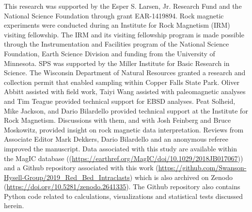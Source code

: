 \documentclass[draft]{agujournal2019}
\begin{document}
%
%
%
%
%
%
%
%


\acknowledgments
This research was supported by the Esper S. Larsen, Jr. Research Fund and the National Science Foundation through grant EAR-1419894. Rock magnetic experiments were conducted during an Institute for Rock Magnetism (IRM) visiting fellowship. The IRM and its visiting fellowship program is made possible through the Instrumentation and Facilities program of the National Science Foundation, Earth Science Division and funding from the University of Minnesota. SPS was supported by the Miller Institute for Basic Research in Science. The Wisconsin Department of Natural Resources granted a research and collection permit that enabled sampling within Copper Falls State Park. Oliver Abbitt assisted with field work, Taiyi Wang assisted with paleomagnetic analyses and Tim Teague provided technical support for EBSD analyses. Peat Solheid, Mike Jackson, and Dario Bilardello provided technical support at the Institute for Rock Magnetism. Discussions with them, and with Josh Feinberg and Bruce Moskowitz, provided insight on rock magnetic data interpretation. Reviews from Associate Editor Mark Dekkers, Dario Bilardello and an anonymous referee improved the manuscript. Data associated with this study are available within the MagIC database ((\url{https://earthref.org/MagIC/doi/10.1029/2018JB017067})) and a Github repository associated with this work (\url{https://github.com/Swanson-Hysell-Group/2019_Red_Bed_Intraclasts}) which is also archived on Zenodo (\url{https://doi.org/10.5281/zenodo.2641335}). The Github repository also contains Python code related to calculations, visualizations and statistical tests discussed herein.  


\end{document}
